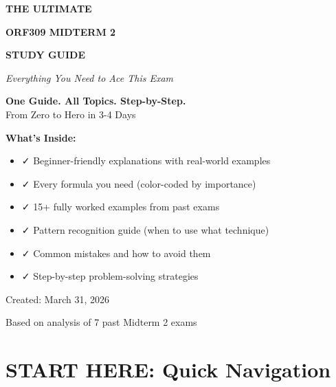 \documentclass[10pt,letterpaper]{article}
\begin{document}
\begin{titlepage}
\centering
\vspace*{1cm}

{\Huge\bfseries\color{criticalcolor} THE ULTIMATE\par}
\vspace{0.3cm}
{\Huge\bfseries ORF309 MIDTERM 2\par}
\vspace{0.3cm}
{\Huge\bfseries STUDY GUIDE\par}

\vspace{1cm}
{\Large\textit{Everything You Need to Ace This Exam}\par}

\vspace{1.5cm}

\begin{tcolorbox}[colback=yellow!10,colframe=orange,width=0.9\textwidth,arc=3mm]
\centering
\large
\textbf{One Guide. All Topics. Step-by-Step.}\\[0.3cm]
From Zero to Hero in 3-4 Days
\end{tcolorbox}

\vspace{1cm}

{\large\textbf{What's Inside:}\par}
\begin{itemize}[leftmargin=2cm]
  \item ✓ Beginner-friendly explanations with real-world examples
  \item ✓ Every formula you need (color-coded by importance)
  \item ✓ 15+ fully worked examples from past exams
  \item ✓ Pattern recognition guide (when to use what technique)
  \item ✓ Common mistakes and how to avoid them
  \item ✓ Step-by-step problem-solving strategies
\end{itemize}

\vfill

{\large Created: March 31, 2026\par}
{\large Based on analysis of 7 past Midterm 2 exams\par}

\end{titlepage}

\tableofcontents
\newpage

\section*{START HERE: Quick Navigation}
\end{document}
